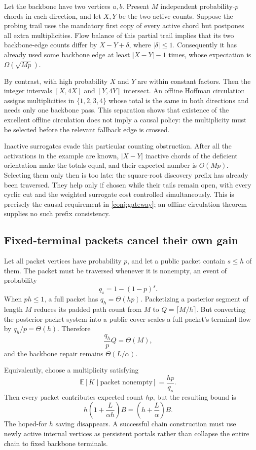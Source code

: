 \documentclass[11pt]{article}
\theoremstyle{remark}
\newcommand{\E}{\mathbb E}
\begin{document}
Let the backbone have two vertices $a,b$.  Present $M$ independent
probability-$p$ chords in each direction, and let $X,Y$ be the two active
counts.  Suppose the probing trail uses the mandatory first copy of every
active chord but postpones all extra multiplicities.  Flow balance of this
partial trail implies that its two backbone-edge counts differ by
$X-Y+\delta$, where $|\delta|\le1$.  Consequently it has already used some
backbone edge at least $|X-Y|-1$ times, whose expectation is
$\Omega(\sqrt{Mp})$.

By contrast, with high probability $X$ and $Y$ are within constant factors.
Then the integer intervals $[X,4X]$ and $[Y,4Y]$ intersect.  An offline
Hoffman circulation assigns multiplicities in $\{1,2,3,4\}$ whose total is
the same in both directions and needs only one backbone pass.  This
separation shows that existence of the excellent offline circulation does
not imply a causal policy: the multiplicity must be selected before the
relevant fallback edge is crossed.

Inactive surrogates evade this particular counting obstruction.  After all
the activations in the example are known, $|X-Y|$ inactive chords of the
deficient orientation make the totals equal, and their expected number is
$O(Mp)$.  Selecting them only then is too late: the square-root discovery
prefix has already been traversed.  They help only if chosen while their
tails remain open, with every cyclic cut and the weighted surrogate cost
controlled simultaneously.  This is precisely the causal requirement in
\cref{conj:gateway}; an offline circulation theorem supplies no such prefix
consistency.

\subsection{Fixed-terminal packets cancel their own gain}

Let all packet vertices have probability $p$, and let a public packet contain
$s\le h$ of them.  The packet must be traversed whenever it is nonempty, an
event of probability
\[
  q_s=1-(1-p)^s.
\]
When $ph\le1$, a full packet has $q_h=\Theta(hp)$.  Packetizing a posterior
segment of length $M$ reduces its padded path count from $M$ to
$Q=\lceil M/h\rceil$.  But converting the posterior packet system into a
public cover scales a full packet's terminal flow by
$q_h/p=\Theta(h)$.  Therefore
\[
  \frac{q_h}{p}Q=\Theta(M),
\]
and the backbone repair remains $\Theta(L/\alpha)$.

Equivalently, choose a multiplicity satisfying
\[
  \E[K\mid\text{packet nonempty}]=\frac{hp}{q_s}.
\]
Then every packet contributes expected count $hp$, but the resulting bound is
\[
  h\left(1+\frac{L}{\alpha h}\right)B
  =\left(h+\frac L\alpha\right)B.
\]
The hoped-for $h$ saving disappears.  A successful chain construction must
use newly active internal vertices as persistent portals rather than collapse
the entire chain to fixed backbone terminals.
\end{document}
